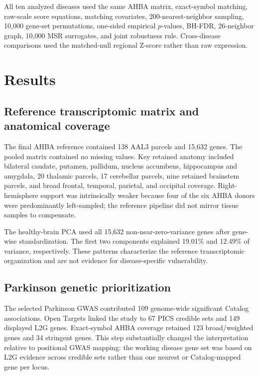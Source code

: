 \documentclass[10pt,twocolumn]{article}
\begin{document}
All ten analyzed diseases used the same AHBA matrix, exact-symbol matching, raw-scale score equations, matching covariates, 200-nearest-neighbor sampling, 10,000 gene-set permutations, one-sided empirical $p$-values, BH-FDR, 26-neighbor graph, 10,000 MSR surrogates, and joint robustness rule. Cross-disease comparisons used the matched-null regional Z-score rather than raw expression.

\section{Results}

\subsection{Reference transcriptomic matrix and anatomical coverage}

The final AHBA reference contained 138 AAL3 parcels and 15,632 genes. The pooled matrix contained no missing values. Key retained anatomy included bilateral caudate, putamen, pallidum, nucleus accumbens, hippocampus and amygdala, 20 thalamic parcels, 17 cerebellar parcels, nine retained brainstem parcels, and broad frontal, temporal, parietal, and occipital coverage. Right-hemisphere support was intrinsically weaker because four of the six AHBA donors were predominantly left-sampled; the reference pipeline did not mirror tissue samples to compensate.

The healthy-brain PCA used all 15,632 non-near-zero-variance genes after gene-wise standardization. The first two components explained 19.01\% and 12.49\% of variance, respectively. These patterns characterize the reference transcriptomic organization and are not evidence for disease-specific vulnerability.

\subsection{Parkinson genetic prioritization}

The selected Parkinson GWAS contributed 109 genome-wide significant Catalog associations. Open Targets linked the study to 67 PICS credible sets and 149 displayed L2G genes. Exact-symbol AHBA coverage retained 123 broad/weighted genes and 34 stringent genes. This step substantially changed the interpretation relative to positional GWAS mapping: the working disease gene set was based on L2G evidence across credible sets rather than one nearest or Catalog-mapped gene per locus.
\end{document}
